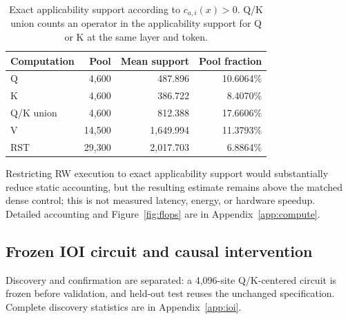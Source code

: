 \documentclass{article}
\begin{document}
\begin{table}[t]
\centering
\caption{Exact applicability support according to \(c_{a,i}(x)>0\). Q/K union
counts an operator in the applicability support for Q or K at the same layer and
token.}
\label{tab:support}
\small
\begin{tabular}{lrrr}
\toprule
Computation & Pool & Mean support & Pool fraction\\
\midrule
Q & 4,600 & 487.896 & 10.6064\%\\
K & 4,600 & 386.722 & 8.4070\%\\
Q/K union & 4,600 & 812.388 & 17.6606\%\\
V & 14,500 & 1,649.994 & 11.3793\%\\
RST & 29,300 & 2,017.703 & 6.8864\%\\
\bottomrule
\end{tabular}
\end{table}

Restricting RW execution to exact applicability support would substantially
reduce static accounting, but the resulting estimate remains above the matched
dense control; this is not measured latency, energy, or hardware speedup. Detailed accounting and
Figure~\ref{fig:flops} are in Appendix~\ref{app:compute}.

\subsection{Frozen IOI circuit and causal intervention}
\label{sec:causal}

Discovery and confirmation are separated: a 4,096-site Q/K-centered circuit is
frozen before validation, and held-out test reuses the unchanged specification.
Complete discovery statistics are in Appendix~\ref{app:ioi}.

\begin{table}[t]
\centering
\caption{Frozen IOI circuit results. Accuracy arrows show intact to
suppressed. Recovery is the fraction of the suppression effect recovered by
exact same-example numerator restoration.}
\label{tab:ioi}
\small
{}
\end{table}
\end{document}

